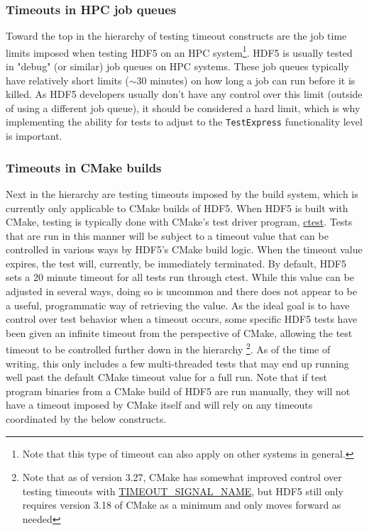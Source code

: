 \documentclass[../HDF5_RFC.tex]{subfiles}
\begin{document}
\subsubsection{Timeouts in HPC job queues}

Toward the top in the hierarchy of testing timeout constructs are the job time limits imposed when
testing HDF5 on an HPC system\footnote{Note that this type of timeout can also apply on other systems in
general.}. HDF5 is usually tested in "debug" (or similar) job queues on HPC systems. These job queues
typically have relatively short limits ($\sim$30 minutes) on how long a job can run before it is killed.
As HDF5 developers usually don't have any control over this limit (outside of using a different job
queue), it should be considered a hard limit, which is why implementing the ability for tests to
adjust to the \texttt{TestExpress} functionality level is important.

\subsubsection{Timeouts in CMake builds}

Next in the hierarchy are testing timeouts imposed by the build system, which is currently only
applicable to CMake builds of HDF5. When HDF5 is built with CMake, testing is typically done with
CMake's test driver program, \href{https://cmake.org/cmake/help/latest/manual/ctest.1.html}{ctest}.
Tests that are run in this manner will be subject to a timeout value that can be controlled in
various ways by HDF5's CMake build logic. When the timeout value expires, the test will, currently,
be immediately terminated. By default, HDF5 sets a 20 minute timeout for all tests run through ctest.
While this value can be adjusted in several ways, doing so is uncommon and there does not appear to be
a useful, programmatic way of retrieving the value. As the ideal goal is to have control over test
behavior when a timeout occurs, some specific HDF5 tests have been given an infinite timeout from
the perspective of CMake, allowing the test timeout to be controlled further down in the hierarchy
\footnote{Note that as of version 3.27, CMake has somewhat improved control over testing timeouts
with \href{https://cmake.org/cmake/help/latest/prop_test/TIMEOUT_SIGNAL_NAME.html}{TIMEOUT\_SIGNAL\_NAME},
but HDF5 still only requires version 3.18 of CMake as a minimum and only moves forward as needed}.
As of the time of writing, this only includes a few multi-threaded tests that may end up running well
past the default CMake timeout value for a full run. Note that if test program binaries from a CMake
build of HDF5 are run manually, they will not have a timeout imposed by CMake itself and will rely
on any timeouts coordinated by the below constructs.
\end{document}
